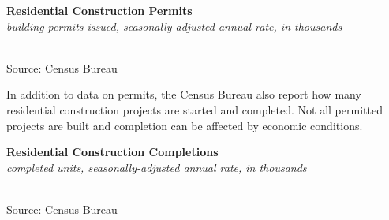 \documentclass{report}
\makeatletter
\newcommand{\tbllink}[1]{\href{https://raw.githubusercontent.com/bdecon/US-chartbook/master/chartbook/data/#1}{\faTable}}
\newcommand*\short[1]{\expandafter\@gobbletwo\number\numexpr#1\relax}
\newcommand{\dateaxisticks}{
		date coordinates in=x, axis line style={draw=none},
		xmax={2023-10-01},
		max space between ticks=40,	    
		xtick={{1990-01-01}, {1992-01-01}, {1994-01-01}, 
			{1996-01-01}, {1998-01-01}, {2000-01-01}, 
			{2002-01-01}, {2004-01-01}, {2006-01-01},
			{2008-01-01}, {2010-01-01}, {2012-01-01}, {2014-01-01},
		    {2016-01-01}, {2018-01-01}, {2020-01-01}, {2022-01-01}, 
		    {2024-01-01}, {2026-01-01}},
		minor xtick={{1989-01-01}, {1991-01-01}, {1993-01-01},
			{1995-01-01}, {1997-01-01}, {1999-01-01}, 
			{2001-01-01}, {2003-01-01}, {2005-01-01}, {2007-01-01},
		    {2009-01-01}, {2011-01-01}, {2013-01-01}, {2015-01-01},
		    {2017-01-01}, {2019-01-01}, {2021-01-01}, {2023-01-01}, 
		    {2025-01-01}, {2027-01-01}},
		enlarge y limits={0.06}, enlarge x limits={0.01},
		}
\newcommand{\bbar}[2]{extra #1 ticks = {{#2}}, extra #1 tick labels = ,
		extra #1 tick style = {grid=major, grid style={thick, black!25}},}
\newcommand{\stdline}[4]{\addplot[very thick, no markers, color=#1] 
		table [x=#2, y=#3, col sep=comma] {#4};	}
\newcommand{\rbars}{
		\fill[color=black!10] (axis cs:{1990-07-01},\pgfkeysvalueof{/pgfplots/ymin}) rectangle 
			(axis cs:{1991-03-01}, \pgfkeysvalueof{/pgfplots/ymax});
		\fill[color=black!10] (axis cs:{2007-12-01},\pgfkeysvalueof{/pgfplots/ymin}) rectangle 
			(axis cs:{2009-07-01}, \pgfkeysvalueof{/pgfplots/ymax});
		\fill[color=black!10] (axis cs:{2001-03-01},\pgfkeysvalueof{/pgfplots/ymin}) rectangle 
			(axis cs:{2001-11-01}, \pgfkeysvalueof{/pgfplots/ymax});
		\fill[color=black!10] (axis cs:{2020-02-01},\pgfkeysvalueof{/pgfplots/ymin}) rectangle 
			(axis cs:{2020-05-01}, \pgfkeysvalueof{/pgfplots/ymax});}
\makeatother
\begin{document}
{\begin{minipage}{0.76\textwidth}
\normalsize{\textbf{Residential Construction Permits}}\\
\footnotesize{\textit{building permits issued, seasonally-adjusted annual rate, in thousands}}\\
\hspace*{-2mm} \\
\footnotesize{Source: Census Bureau} \hfill \tbllink{permits_total.csv}
\vspace{2mm}

\small In addition to data on permits, the Census Bureau also report how many residential construction projects are started and completed. Not all permitted projects are built and completion can be affected by economic conditions. 
\vspace{1mm}

\normalsize{\textbf{Residential Construction Completions}}\\
\footnotesize{\textit{completed units, seasonally-adjusted annual rate, in thousands}}\\
\hspace*{-2mm} \\
\footnotesize{Source: Census Bureau} \hfill \tbllink{permits_total.csv}
\vspace{2mm}

\small 
\vspace{1mm}


\end{minipage}}
\end{document}
